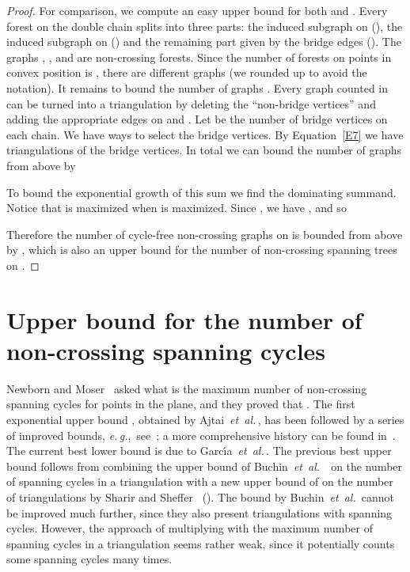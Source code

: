 \documentclass[11pt]{article}
\def\etal{{\it et~al.}\,}
\def\eg{{\it e.\,g.},~}
\begin{document}
\begin{proof}
For comparison, we compute an easy upper bound for both
 and .
Every forest  on the double chain splits into three parts: the
induced subgraph on  (),
the induced subgraph on  () and the remaining part given by
the bridge edges (). The graphs , , and  are
non-crossing forests.
Since the number of forests on  points in convex position is
, there are  different graphs 
(we rounded up to avoid the  notation).
It remains to bound the number of graphs . Every graph counted in
 can be turned into a triangulation by deleting the ``non-bridge
vertices'' and adding the appropriate edges on  and . Let  be
the number of bridge vertices on each chain. We have 
ways to select the bridge vertices. By Equation~\eqref{E7} we have
 triangulations of the bridge vertices. In total we
can bound the number of graphs  from above by
 
To bound the exponential growth of this sum we find the dominating
summand. Notice that  is maximized when
 is maximized.
Since , we have ,
and so


Therefore the number of cycle-free non-crossing graphs on  is
bounded from above by
,
which is also an upper bound for the number of non-crossing spanning
trees on .
\end{proof}


\section{Upper bound for the number of non-crossing spanning cycles}
\label{sec:cycles}

Newborn and Moser~\cite{NM80} asked what is the maximum number
of non-crossing spanning cycles for  points in the plane, and they proved
that .
The first exponential upper bound , obtained by
Ajtai~\etal\cite{ACNS82}, has been followed by a series of
improved bounds, \eg see~\cite{BKK+07,D99,SW06}; a more comprehensive history
can be found in~\cite{Dem10}. The current best lower bound
 is due to Garc\'{\i}a~\etal\cite{GNT00}.
The previous best upper bound  follows from combining the
upper bound  of Buchin~\etal~\cite{BKK+07} on the number of
spanning cycles in a triangulation with a new upper bound of 
on the number of triangulations by Sharir and Sheffer~\cite{SS10}
().
The bound by Buchin~\etal\cite{BKK+07} cannot be improved much further,
since they also present triangulations with  spanning cycles.
However, the approach of multiplying  with the maximum number
of spanning cycles in a triangulation seems rather weak, since it 
potentially counts some spanning cycles many times.
\end{document}
